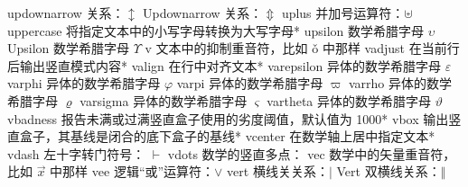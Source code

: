 \capcs updownarrow {关系：$\updownarrow$}{}{}
\capcs Updownarrow {关系：$\Updownarrow$}{}{}
\capcs uplus {并加号运算符：$\uplus$}{}{}
\capcs uppercase {将指定文本中的小写字母转换为大写字母}*{}
\capcs upsilon {数学希腊字母 $\upsilon$}{}{}
\capcs Upsilon {数学希腊字母 $\Upsilon$}{}{}
\capcs v {文本中的抑制重音符，比如 \v o 中那样}{}{}
\capcs vadjust {在当前行后输出竖直模式内容}*{}
\capcs valign {在行中对齐文本}*{}
\capcs varepsilon {异体的数学希腊字母 $\varepsilon$}{}{}
\capcs varphi {异体的数学希腊字母 $\varphi$}{}{}
\capcs varpi {异体的数学希腊字母 $\varpi$}{}{}
\capcs varrho {异体的数学希腊字母 $\varrho$}{}{}
\capcs varsigma {异体的数学希腊字母 $\varsigma$}{}{}
\capcs vartheta {异体的数学希腊字母 $\vartheta$}{}{}
\capcs vbadness {报告未满或过满竖直盒子使用的劣度阈值，默认值为 1000}*{}
\capcs vbox {输出竖直盒子，其基线是闭合的底下盒子的基线}*{}
\capcs vcenter {在数学轴上居中指定文本}*{}
\capcs vdash {左十字转门符号： $\vdash$}{}{}
\capcs vdots {数学的竖直多点：\smash{$\vdots$}}{}{}
\capcs vec {数学中的矢量重音符，比如 $\vec x$ 中那样}{}{}
\capcs vee {逻辑“或”运算符：$\vee$}{}{}
\capcs vert {横线关关系：$\vert$}{}{}
\capcs Vert {双横线关系：$\Vert$}{}{}
